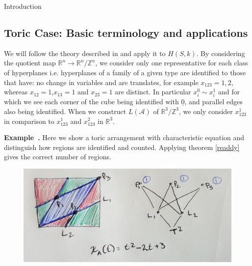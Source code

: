 \documentclass[a4paper,12pt]{article}
\newcounter{example}[]
\newenvironment{example}[1][]{\refstepcounter{example}\par\medskip
   \noindent \textbf{Example~\theexample. #1} \rmfamily}{\medskip}
\theoremstyle{definition}
\theoremstyle{indented}
\begin{document}
\begin{section}{Introduction}
\section{Toric Case: Basic terminology and applications}

We will follow the theory described in \cite[p.9-15]{Ehrenborg2008AffineArrangements} and apply it to $H(S,k)$. By considering the quotient map $\mathbb{R}^n \rightarrow \mathbb{R}^{n} / \mathbb{Z}^n$, we consider only one representative for each class of hyperplanes i.e. hyperplanes of a family of a given type are identified to those that have: no change in variables and are translates, for example $x_{123}=1,2$, whereas $x_{12}=1$,$x_{13}=1$ and $x_{23}=1$ are distinct. In particular $x_i^{0} \sim x_i^{1} $ and for which we see each corner of the cube being identified with $\underline{0}$, and parallel edges also being identified. When we construct  $L(\mathcal{A})$ of $\mathbb{R}^3/\mathbb{Z}^3$, we only consider $x_{123}^{1}$ in comparison to $x_{123}^{1}$ and $x_{123}^{2}$ in $\mathbb{R}^3$. 


\begin{example} Here we show a toric arrangement with characteristic equation and distinguish how regions are identified and counted. Applying theorem \ref{readdy} gives the correct number of regions. 
\begin{figure}[H]
    \centering
 \includegraphics[scale=0.12,angle=0]{29072020 pics/toricposet.jpg}  
    \caption{}
    \label{}
\end{figure}
\end{example}


\end{section}
\end{document}

